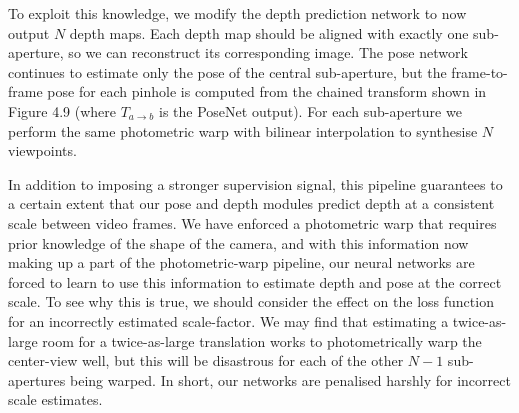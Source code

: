 To exploit this knowledge, we modify the depth prediction network to now output $N$ depth maps. Each depth map should be aligned with exactly one sub-aperture, so we can reconstruct its corresponding image. The pose network continues to estimate only the pose of the central sub-aperture, but the frame-to-frame pose for each pinhole is computed from the chained transform shown in Figure 4.9 (where $T_{a\rightarrow b}$ is the PoseNet output). For each sub-aperture we perform the same photometric warp with bilinear interpolation to synthesise $N$ viewpoints.

In addition to imposing a stronger supervision signal, this pipeline guarantees to a certain extent that our pose and depth modules predict depth at a consistent scale between video frames. We have enforced a photometric warp that requires prior knowledge of the shape of the camera, and with this information now making up a part of the photometric-warp pipeline, our neural networks are forced to learn to use this information to estimate depth and pose at the correct scale. To see why this is true, we should consider the effect on the loss function for an incorrectly estimated scale-factor. We may find that estimating a twice-as-large room for a twice-as-large translation works to photometrically warp the center-view well, but this will be disastrous for each of the other $N-1$ sub-apertures being warped. In short, our networks are penalised harshly for incorrect scale estimates.
